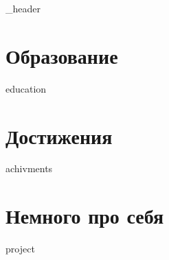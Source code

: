 \documentclass[letter,10pt]{article}
\author{Роман Шабаев}
\begin{document}
{_header}
\vspace*{10pt}

\section{Образование}
{education}
\vspace*{10pt}

\section{Достижения}
{achivments}
\vspace*{10pt}

\section{Немного про себя}
\vspace*{3pt}
{project}
\vspace*{10pt}
\end{document}
